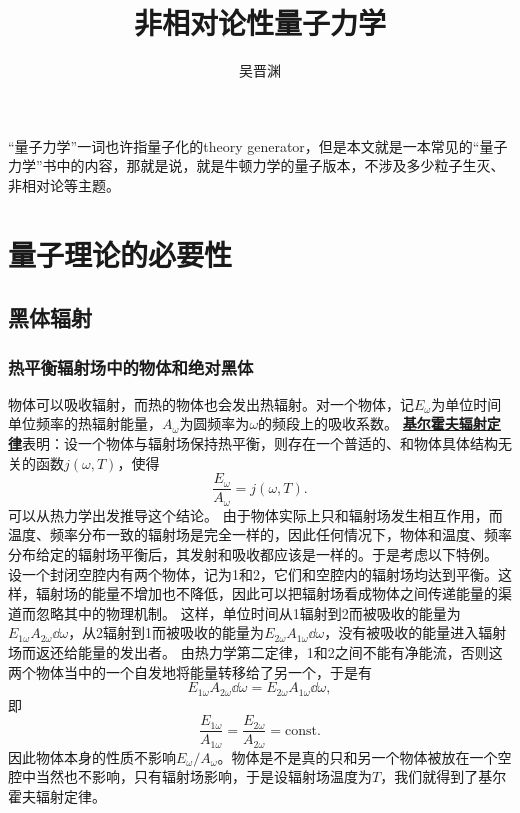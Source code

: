 \documentclass[UTF8, a4paper]{ctexart}
\title{非相对论性量子力学}
\author{吴晋渊}
\newcommand*{\const}{\mathrm{const}}
\newcommand{\concept}[1]{\underline{\textbf{#1}}}
\begin{document}
\maketitle

“量子力学”一词也许指量子化的theory generator，但是本文就是一本常见的“量子力学”书中的内容，那就是说，就是牛顿力学的量子版本，不涉及多少粒子生灭、非相对论等主题。

\section{量子理论的必要性}

\subsection{黑体辐射}

\subsubsection{热平衡辐射场中的物体和绝对黑体}

物体可以吸收辐射，而热的物体也会发出热辐射。对一个物体，记$E_\omega$为单位时间单位频率的热辐射能量，$A_\omega$为圆频率为$\omega$的频段上的吸收系数。
\concept{基尔霍夫辐射定律}表明：设一个物体与辐射场保持热平衡，则存在一个普适的、和物体具体结构无关的函数$j(\omega, T)$，使得
\begin{equation}
    \frac{E_\omega}{A_\omega} = j(\omega, T).
\end{equation}
可以从热力学出发推导这个结论。
由于物体实际上只和辐射场发生相互作用，而温度、频率分布一致的辐射场是完全一样的，因此任何情况下，物体和温度、频率分布给定的辐射场平衡后，其发射和吸收都应该是一样的。于是考虑以下特例。
设一个封闭空腔内有两个物体，记为1和2，它们和空腔内的辐射场均达到平衡。这样，辐射场的能量不增加也不降低，因此可以把辐射场看成物体之间传递能量的渠道而忽略其中的物理机制。
这样，单位时间从1辐射到2而被吸收的能量为$E_{1\omega} A_{2\omega} \dd{\omega}$，从2辐射到1而被吸收的能量为$E_{2\omega} A_{1\omega} \dd{\omega}$，没有被吸收的能量进入辐射场而返还给能量的发出者。
由热力学第二定律，1和2之间不能有净能流，否则这两个物体当中的一个自发地将能量转移给了另一个，于是有
\[
    E_{1\omega} A_{2\omega} \dd{\omega} = E_{2\omega} A_{1\omega} \dd{\omega},
\]
即
\[
    \frac{E_{1\omega}}{A_{1\omega}} = \frac{E_{2\omega}}{A_{2\omega}} = \const.
\]
因此物体本身的性质不影响$E_\omega / A_\omega$。物体是不是真的只和另一个物体被放在一个空腔中当然也不影响，只有辐射场影响，于是设辐射场温度为$T$，我们就得到了基尔霍夫辐射定律。
\end{document}
